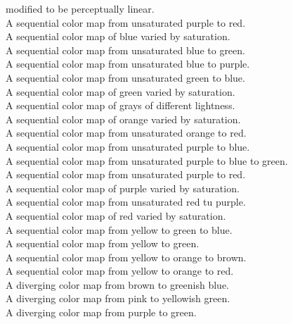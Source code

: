 \begin{longtabu}
  modified to be perceptually linear. \\
   A sequential color map from unsaturated purple to red. \\
   A sequential color map of blue varied by saturation. \\
   A sequential color map from unsaturated blue to green. \\
   A sequential color map from unsaturated blue to purple. \\
   A sequential color map from unsaturated green to blue. \\
   A sequential color map of green varied by saturation. \\
   A sequential color map of grays of different lightness. \\
   A sequential color map of orange varied by saturation. \\
   A sequential color map from unsaturated orange to red. \\
   A sequential color map from unsaturated purple to blue. \\
   A sequential color map from unsaturated purple to blue
  to green. \\
   A sequential color map from unsaturated purple to red. \\
   A sequential color map of purple varied by saturation. \\
   A sequential color map from unsaturated red tu purple. \\
   A sequential color map of red varied by saturation. \\
   A sequential color map from yellow to green to blue. \\
   A sequential color map from yellow to green. \\
   A sequential color map from yellow to orange to brown. \\
   A sequential color map from yellow to orange to red. \\
   A diverging color map from brown to greenish blue. \\
   A diverging color map from pink to yellowish green. \\
   A diverging color map from purple to green. \\

\end{longtabu}
